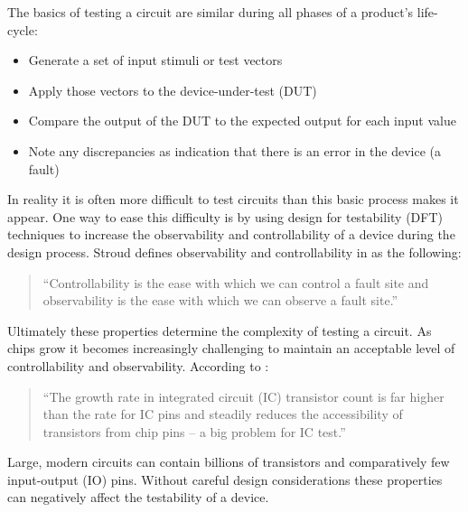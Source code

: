 \documentclass[12pt]{report}
\begin{document}
The basics of testing a circuit are similar during all phases of a product's life-cycle:
\begin{itemize}
\item Generate a set of input stimuli or test vectors
\item Apply those vectors to the device-under-test (DUT)
\item Compare the output of the DUT to the expected output for each input value
\item Note any discrepancies as indication that there is an error in the device (a fault)
\end{itemize}
In reality it is often more difficult to test circuits than this basic process makes it appear.  One way to ease this difficulty is by using design for testability (DFT) techniques to increase the observability and controllability of a device during the design process\cite{stroud}.  Stroud defines observability and controllability in \cite{stroud} as the following:
\begin{quote}
``Controllability is the ease with which we can control a fault site and observability is the ease with which we can observe a fault site.\cite{stroud}''
\end{quote}
Ultimately these properties determine the complexity of testing a circuit.  As chips grow it becomes increasingly challenging to maintain an acceptable level of controllability and observability.  According to \cite{zorian}: 
\begin{quote}
``The growth rate in integrated circuit (IC) transistor count is far higher than the rate for IC pins and steadily reduces the accessibility of transistors from chip pins -- a big problem for IC test.\cite{zorian}''
\end{quote}
Large, modern circuits can contain billions of transistors and comparatively few input-output (IO) pins\cite{zorian}.  Without careful design considerations these properties can negatively affect the testability of a device\cite{stroud}.
\end{document}
